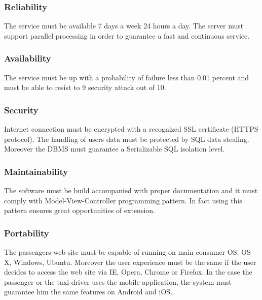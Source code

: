 \subsubsection{Reliability}
The service must be available 7 days a week 24 hours a day.  The server must support parallel processing in order to guarantee a fast and continuous service.
%
\subsubsection{Availability}
The service must be up with a probability of failure less than 0.01 percent and must be able to resist to 9 security attack out of 10.
%
\subsubsection{Security}
Internet connection must be encrypted with a recognized SSL certificate (HTTPS protocol). The handling of users data must be protected by SQL data stealing. Moreover the DBMS must guarantee a Serializable SQL isolation level.
%
\subsubsection{Maintainability}
The software must be build accompanied with proper documentation and it must comply with Model-View-Controller programming pattern. In fact using this pattern ensures great opportunities of extension.
%
\subsubsection{Portability}
The passengers web site must be capable of running on main consumer OS: OS X, Windows, Ubuntu.
Moreover the user experience must be the same if the user decides to access the web site via IE, Opera, Chrome or Firefox.
In the case the passenger or the taxi driver uses the mobile application, the system must guarantee him the same features on Android and iOS.